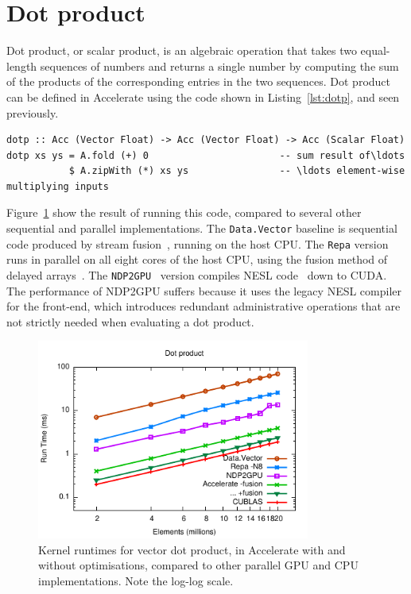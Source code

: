 

\section{Dot product}
\label{sec:dotp}

Dot product, or scalar product, is an algebraic operation that takes two
equal-length sequences of numbers and returns a single number by computing the
sum of the products of the corresponding entries in the two sequences. Dot
product can be defined in Accelerate using the code shown in
Listing~\ref{lst:dotp}, and seen previously.

\begin{lstlisting}[style=haskell_float
    ,label=lst:dotp
    ,caption={Vector dot-product}]
dotp :: Acc (Vector Float) -> Acc (Vector Float) -> Acc (Scalar Float)
dotp xs ys = A.fold (+) 0                       -- sum result of\ldots
           $ A.zipWith (*) xs ys                -- \ldots element-wise multiplying inputs
\end{lstlisting}

Figure~\ref{fig:dotp} show the result of running this code, compared to several
other sequential and parallel implementations. The \texttt{Data.Vector} baseline
is sequential code produced by stream
fusion~\cite{Coutts:2007kp}, running on the host CPU. The \texttt{Repa} version
runs in parallel on all eight cores of the host CPU, using the fusion method of
delayed arrays~\cite{Keller:2010er}. The
\texttt{NDP2GPU}~\cite{Bergstrom:2012bi} version compiles NESL
code~\cite{Blelloch:1995ut} down to CUDA. The performance of NDP2GPU suffers
because it uses the legacy NESL compiler for the front-end, which introduces
redundant administrative operations that are not strictly needed when evaluating
a dot product.

\begin{figure}
    \begin{center}
        \includegraphics[width=0.8\textwidth]{images/sec-6/dotp/dotp}
    \end{center}
    \caption[Vector dot product kernel benchmarks]{Kernel runtimes for vector
        dot product, in Accelerate with and without optimisations, compared to
        other parallel GPU and CPU implementations. Note the log-log scale.}
    \label{fig:dotp}
\end{figure}


